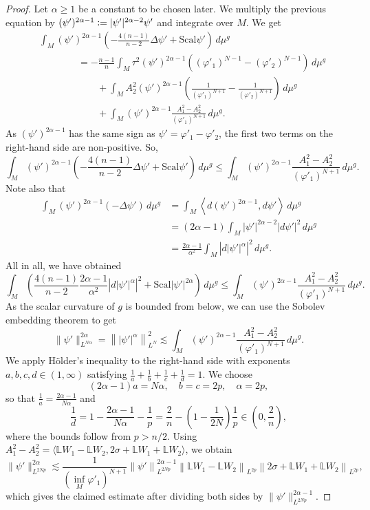 \documentclass[a4paper, 10pt, reqno]{amsart}
\theoremstyle{plain}
\theoremstyle{remark}
\theoremstyle{definition}
\renewcommand{\phi}{\varphi}
\newcommand{\bL}{\mathbb{L}}
\newcommand{\definedas}{\mathrel{\raise.095ex\hbox{\rm :}\mkern-5.2mu=}}
\let\<\langle
\let\>\rangle
\newcommand{\scal}{\mathrm{Scal}}
\begin{document}
\begin{proof}
	Let $\alpha \geq 1$ be a constant to be chosen later. We multiply the previous
	equation by $(\psi')^{2\alpha-1} \definedas |\psi'|^{2\alpha-2} \psi'$ and
	integrate over $M$. We get
	\begin{align*}
		 & \int_M (\psi')^{2\alpha-1}\left(- \frac{4(n-1)}{n-2} \Delta \psi' + \scal \psi'\right)\, d\mu^g                                   \\
		 & \qquad\qquad = -\frac{n-1}{n} \int_M \tau^2 (\psi')^{2\alpha-1} \left((\phi'_1)^{N-1} - (\phi'_2)^{N-1}\right) \, d\mu^g          \\
		 & \qquad\qquad\qquad + \int_M A_2^2 (\psi')^{2\alpha-1} \left(\frac{1}{(\phi'_1)^{N+1}} - \frac{1}{(\phi'_2)^{N+1}}\right)\, d\mu^g \\
		 & \qquad\qquad\qquad + \int_M (\psi')^{2\alpha-1} \frac{A_1^2 - A_2^2}{(\phi'_1)^{N+1}}\, d\mu^g.
	\end{align*}
	As $(\psi')^{2\alpha-1}$ has the same sign as $\psi' = \phi'_1 - \phi'_2$, the
	first two terms on the right-hand side are non-positive. So,
	\[
		\int_M (\psi')^{2\alpha-1}\left(- \frac{4(n-1)}{n-2} \Delta \psi' + \scal \psi'\right)\, d\mu^g
		\leq \int_M (\psi')^{2\alpha-1} \frac{A_1^2 - A_2^2}{(\phi'_1)^{N+1}}\, d\mu^g.
	\]
	Note also that
	\begin{align*}
		\int_M (\psi')^{2\alpha-1} (-\Delta \psi') \, d\mu^g
		 & = \int_M \left\<d (\psi')^{2\alpha-1}, d\psi'\right\>\, d\mu^g                \\
		 & = (2\alpha - 1) \int_M |\psi'|^{2\alpha-2}\left| d\psi'\right|^2\, d\mu^g     \\
		 & = \frac{2\alpha-1}{\alpha^2} \int_M \left| d|\psi'|^\alpha\right|^2\, d\mu^g.
	\end{align*}
	All in all, we have obtained
	\[
		\int_M \left(\frac{4(n-1)}{n-2} \frac{2\alpha-1}{\alpha^2} \left| d|\psi'|^\alpha\right|^2 + \scal |\psi'|^{2\alpha}\right)\, d\mu^g
		\leq \int_M (\psi')^{2\alpha-1} \frac{A_1^2 - A_2^2}{(\phi'_1)^{N+1}}\, d\mu^g.
	\]
	As the scalar curvature of $g$ is bounded from below, we can use the Sobolev
	embedding theorem to get
	\[
		\|\psi'\|_{L^{N\alpha}}^{2\alpha} = \left\||\psi'|^\alpha\right\|_{L^N}^2
		\lesssim \int_M (\psi')^{2\alpha-1} \frac{A_1^2 - A_2^2}{(\phi'_1)^{N+1}}\, d\mu^g.
	\]
	We apply H\"older's inequality to the right-hand side with exponents $a, b, c,
		d \in (1, \infty)$ satisfying $\frac{1}{a} + \frac{1}{b} + \frac{1}{c} +
		\frac{1}{d} = 1$. We choose
	\[
		(2\alpha-1)a = N\alpha,
		\quad
		b = c = 2p,
		\quad
		\alpha = 2p,
	\]
	so that $\frac{1}{a} = \frac{2\alpha - 1}{N\alpha}$ and
	\[
		\frac{1}{d} = 1 - \frac{2\alpha-1}{N\alpha} - \frac{1}{p}
		= \frac{2}{n} - \left(1 - \frac{1}{2N}\right)\frac{1}{p}
		\in \left(0, \frac{2}{n}\right),
	\]
	where the bounds follow from $p > n/2$. Using $A_1^2 - A_2^2 = \< \bL W_1 - \bL
		W_2, 2\sigma + \bL W_1 + \bL W_2\>$, we obtain
	\[
		\|\psi'\|_{L^{2Np}}^{2\alpha}
		\lesssim \frac{1}{\left(\inf_M \phi'_1\right)^{N+1}}
		\left\|\psi'\right\|_{L^{2Np}}^{2\alpha-1}
		\left\|\bL W_1 - \bL W_2\right\|_{L^{2p}}
		\left\|2 \sigma + \bL W_1 + \bL W_2\right\|_{L^{2p}},
	\]
	which gives the claimed estimate after dividing both sides by
	$\|\psi'\|_{L^{2Np}}^{2\alpha-1}$.
\end{proof}
\end{document}
